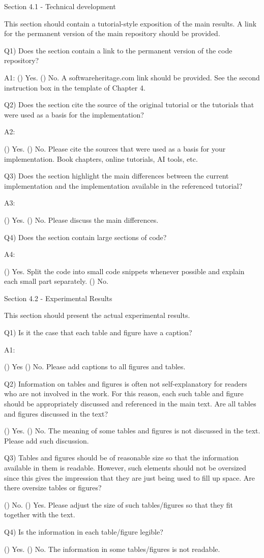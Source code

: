 Section 4.1 - Technical development

This section should contain a tutorial-style exposition of the main results. A link for the permanent version of the main repository should be provided. 

Q1) Does the section contain a link to the permanent version of the code repository? 

A1: 
() Yes. 
() No. A softwareheritage.com link should be provided. See the second instruction box in the template of Chapter 4. 

Q2) Does the section cite the source of the original tutorial or the tutorials that were used as a basis for the implementation? 

A2: 

() Yes.
() No. Please cite the sources that were used as a basis for your implementation. Book chapters, online tutorials, AI tools, etc.  

Q3) Does the section highlight the main differences between the current implementation and the implementation available in the referenced tutorial? 

A3: 

() Yes. 
() No. Please discuss the main differences. 

Q4) Does the section contain large sections of code? 

A4: 

() Yes. Split the code into small code snippets whenever possible and explain each small part separately. 
() No. 


Section 4.2 - Experimental Results

This section should present the actual experimental results. 

Q1) Is it the case that each table and figure have a caption? 

A1: 

() Yes
() No. Please add captions to all figures and tables. 

Q2) Information on tables and figures is often not self-explanatory for readers who are not involved in the work. For this reason, each such table and figure should be appropriately discussed and referenced in the main text. Are all tables and figures discussed in the text? 

() Yes. 
() No. The meaning of some tables and figures is not discussed in the text. Please add such discussion.  

Q3) Tables and figures should be of reasonable size so that the information available in them is readable. However, such elements should not be oversized since this gives the impression that they are just being used to fill up space. Are there oversize tables or figures? 

() No. 
() Yes. Please adjust the size of such tables/figures so that they fit together with the text. 

Q4) Is the information in each table/figure legible? 

() Yes. 
() No. The information in some tables/figures is not readable. 